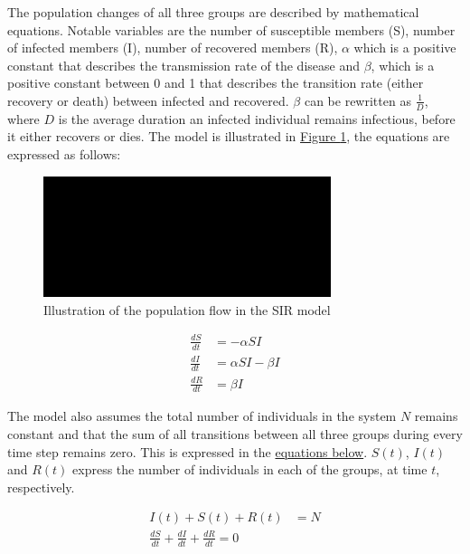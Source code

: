 \par
The population changes of all three groups are described by mathematical equations\cite{mathSIR}. Notable variables
are the number of susceptible members (S), number of infected members (I), number of recovered members (R), $\alpha$
which is a positive constant that describes the transmission rate of the disease and $\beta$, which is a positive
constant between 0 and 1 that describes the transition rate (either recovery or death) between infected and recovered.
$\beta$ can be rewritten as $\frac{1}{D}$, where $D$ is the average duration an infected individual remains infectious,
before it either recovers or dies. The model is illustrated in \hyperref[fig:SIR]{Figure \ref*{fig:SIR}}, the equations
are expressed as follows:

\begin{figure}
	\begin{center}
		\includegraphics[width=0.75\textwidth]{./figures/SIR.png}
		\caption{Illustration of the population flow in the SIR model}
		\label{fig:SIR}
	\end{center}
\end{figure}


\begin{align}
	\label{eq:SIR1}
	\frac{dS}{dt} &= -\alpha S I \\
	\frac{dI}{dt} &= \alpha S I - \beta I \\
	\frac{dR}{dt} &= \beta I
\end{align}

The model also assumes the total number of individuals in the system $N$ remains constant and that the sum of all transitions
between all three groups during every time step remains zero. This is expressed in the \hyperref[eq:SIR2]{equations below}.
$S(t)$, $I(t)$ and $R(t)$ express the number of individuals in each of the groups, at time $t$, respectively.

\begin{align}
	\label{eq:SIR2}
	I(t) + S(t) + R(t) &= N \\
	\frac{dS}{dt} + \frac{dI}{dt} + \frac{dR}{dt} = 0
\end{align}

